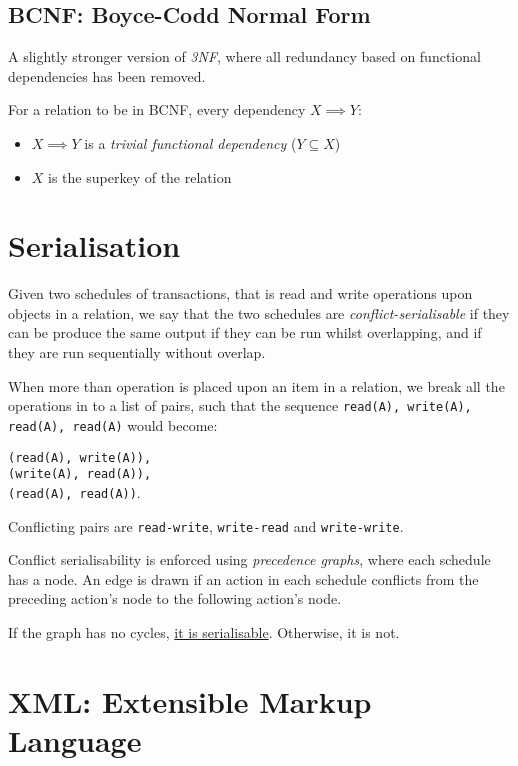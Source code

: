 \documentclass{article}
\begin{document}
\subsection{BCNF: Boyce-Codd Normal Form}

A slightly stronger version of \textit{3NF}, where all redundancy based on functional dependencies has been removed.

For a relation to be in BCNF, every dependency $X \implies Y$:

\begin{itemize}
\item 
  $X \implies Y$ is a \textit{trivial functional dependency} ($Y \subseteq X$)
\item
  $X$ is the superkey of the relation
\end{itemize}

\section{Serialisation}

Given two schedules of transactions, that is read and write operations upon objects in a relation, we say that the two schedules are \textit{conflict-serialisable} if they can be produce the same output if they can be run whilst overlapping, and if they are run sequentially without overlap.

When more than operation is placed upon an item in a relation, we break all the operations in to a list of pairs, such that the sequence \texttt{read(A), write(A), read(A), read(A)} would become:

\texttt{(read(A), write(A)),\\ (write(A), read(A)),\\ (read(A), read(A))}.

Conflicting pairs are \texttt{read-write}, \texttt{write-read} and \texttt{write-write}. 

Conflict serialisability is enforced using \textit{precedence graphs}, where each schedule has a node. An edge is drawn if an action in each schedule conflicts from the preceding action's node to the following action's node.

If the graph has no cycles, \underline{it is serialisable}. Otherwise, it is not.

\filbreak
\section{XML: Extensible Markup Language}
\end{document}

